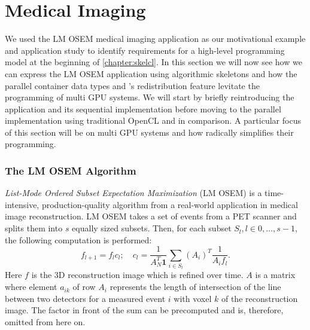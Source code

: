 \section{Medical Imaging}
\label{section:medical-imaging}

We used the LM OSEM medical imaging application as our motivational example and application study to identify requirements for a high-level programming model at the beginning of \autoref{chapter:skelcl}.
In this section we will now see how we can express the LM OSEM application using algorithmic skeletons and how the parallel container data types and \SkelCL's redistribution feature levitate the programming of multi GPU systems.
We will start by briefly reintroducing the application and its sequential implementation before moving to the parallel implementation using traditional OpenCL and \SkelCL in comparison.
A particular focus of this section will be on multi GPU systems and how \SkelCL radically simplifies their programming.

\subsubsection*{The LM OSEM Algorithm}
\emph{List-Mode Ordered Subset Expectation Maximization} (LM OSEM) is a time-intensive, production-quality algorithm from a real-world application in medical image reconstruction.
LM OSEM takes a set of events from a PET scanner and splits them into $s$ equally sized subsets.
Then, for each subset $S_l, l \in {0, \ldots, s-1}$, the following computation is performed:
\begin{equation}
 f_{l+1}=f_{l}c_{l};\quad
 c_{l}=\dfrac{1}{A_N^T \textbf{1}}
\sum_{i \in S_{l}} (A_i)^T \dfrac{1}{A_{i} f_{l}}.
\label{eq:lm_osem2}
\end{equation}
Here $f$ is the 3D reconstruction image which is refined over time.
$A$ is a matrix where element $a_{ik}$ of row $A_i$ represents the length of intersection of the line between two detectors for a measured event $i$ with voxel $k$ of the reconstruction image.
The factor in front of the sum can be precomputed and is, therefore, omitted from here on.

